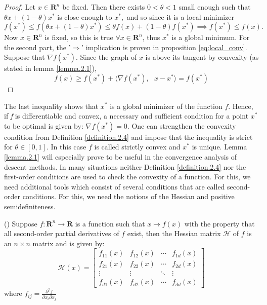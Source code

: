 \begin{proof}
Let $x \in \mathbf{R}^n$ be fixed. Then there exists $0 < \theta < 1$ small enough such that $\theta x + (1-\theta)x^{*}$ is close enough to $x^{*},$ and so since it is a local minimizer $$f(x^{*}) \leq f(\theta x + (1-\theta)x^{*}) \leq \theta f(x) + (1-\theta) f(x^{*}) \implies f(x^{*}) \leq f(x).$$ Now $x \in \mathbf{R}^n$ is fixed, so this is true $\forall x \in \mathbf{R}^n$, thus $x^{*}$ is a global minimum. For the second part, the '$\Rightarrow$' implication is proven in proposition \ref{eq:local_conv}. Suppose that $\nabla f(x^{*}).$ Since the graph of $x$ is above its tangent by convexity (as stated in lemma \ref{lemma.2.1}), 
\begin{equation*}
f(x) \geq f(x^{*}) + \langle \nabla f(x^{*}),\text{ }x - x^{*}\rangle = f(x^{*})
\end{equation*}
\end{proof}
The last inequality shows that $x^{*}$ is a global minimizer of the function $f$. Hence, if \textit{f} is differentiable and convex, a necessary and sufficient condition for a point $x^{*}$ to be optimal is given by: $\nabla f(x^{*}) = 0.$ One can strengthen the convexity condition from Definition \ref{definition.2.4} and impose that the inequality is strict for $\theta \in [0,1].$ In this case $f$ is called strictly convex and $x^{*}$ is unique. Lemma \ref{lemma.2.1} will especially prove to be useful in the convergence analysis of descent methods. In many situations neither Definition \ref{definition.2.4} nor the first-order conditions are used to check the convexity of a function. For this, we need additional tools which consist of several conditions that are called second-order conditions. For this, we need the notions of the Hessian and positive semidefiniteness. 

\begin{definition}[Hessian]
(\cite[748]{adams2013calculus})
Suppose $f: \mathbf{R}^{n} \longrightarrow \mathbf{R}$ is a function such that $x\mapsto f(x)$ with the property that all second-order partial derivatives of $f$ exist, then the Hessian matrix $\mathcal{H}$ of $f$ is an $n \times n$ matrix and is given by:
\begin{equation*}
\mathcal{H}(x) = 
\begin{bmatrix}
f_{11}(x) & f_{12}(x) & \cdots & f_{1d}(x) \\
f_{21}(x) & f_{22}(x) & \cdots & f_{2d}(x) \\
\vdots             & \vdots             & \ddots & \vdots             \\
f_{d1}(x) & f_{d2}(x) & \cdots & f_{dd}(x)
\end{bmatrix}
\end{equation*}
where $f_{ij} = \frac{\partial^{2}f}{\partial x_{i}\partial x_{j}}$
\end{definition}

